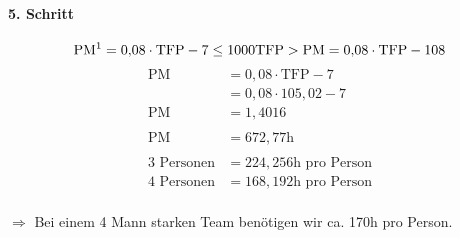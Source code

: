 \paragraph{5. Schritt}
\[\text{PM\footnotemark} = 0{,}08 \cdot \text{TFP}-7 \leq 1000\text{TFP} > \text{PM} = 0{,}08 \cdot \text{TFP}-108\]
\begin{align*}
	\text{PM} &= 0{,}08 \cdot \text{TFP} - 7 \\
			  &= 0{,}08 \cdot 105{,}02 -7\\
	\text{PM} &= 1{,}4016\\
	\\
	\text{PM} &= 672{,}77 \text{h}\\
	\\
	\text{3 Personen} &= 224{,}256\text{h pro Person}\\
	\text{4 Personen} &= 168{,}192\text{h pro Person}\\
\end{align*}

$\Rightarrow$ Bei einem 4 Mann starken Team benötigen wir ca. 170h pro Person.